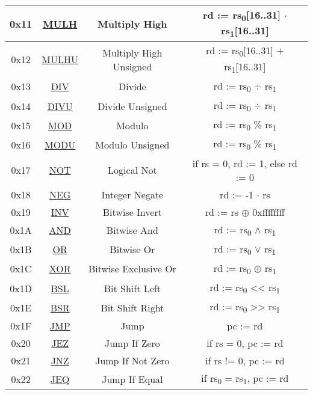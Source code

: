 \begin{center}
\begin{tabular}{|c|c|c|c|}
		\hline
		0x11 & \hyperref[sec:MULH]{MULH} & Multiply High & rd := rs\textsubscript{0}[16..31] $\cdot$ rs\textsubscript{1}[16..31]\\
		\hline
		0x12 & \hyperref[sec:MULHU]{MULHU} & Multiply High Unsigned & rd := rs\textsubscript{0}[16..31] $+$ rs\textsubscript{1}[16..31]\\
		\hline
		0x13 & \hyperref[sec:DIV]{DIV} & Divide & rd := rs\textsubscript{0} $\div$ rs\textsubscript{1}\\
		\hline
		0x14 & \hyperref[sec:DIVU]{DIVU} & Divide Unsigned & rd := rs\textsubscript{0} $\div$ rs\textsubscript{1}\\
		\hline
		0x15 & \hyperref[sec:MOD]{MOD} & Modulo & rd := rs\textsubscript{0} \% rs\textsubscript{1}\\
		\hline
		0x16 & \hyperref[sec:MODU]{MODU} & Modulo Unsigned & rd := rs\textsubscript{0} \% rs\textsubscript{1}\\
		\hline
		\hline
		0x17 & \hyperref[sec:NOT]{NOT} & Logical Not & if rs = 0, rd := 1, else rd := 0\\
		\hline
		0x18 & \hyperref[sec:NEG]{NEG} & Integer Negate & rd := -1 $\cdot$ rs\\
		\hline
		0x19 & \hyperref[sec:INV]{INV} & Bitwise Invert & rd := rs $\oplus$ 0xffffffff\\
		\hline
		\hline
		0x1A & \hyperref[sec:AND]{AND} & Bitwise And & rd := rs\textsubscript{0} $\land$ rs\textsubscript{1}\\
		\hline
		0x1B & \hyperref[sec:OR]{OR} & Bitwise Or & rd := rs\textsubscript{0} $\lor$ rs\textsubscript{1}\\
		\hline
		0x1C & \hyperref[sec:XOR]{XOR} & Bitwise Exclusive Or & rd := rs\textsubscript{0} $\oplus$ rs\textsubscript{1}\\
		\hline
		0x1D & \hyperref[sec:BSL]{BSL} & Bit Shift Left & rd := rs\textsubscript{0} << rs\textsubscript{1}\\
		\hline
		0x1E & \hyperref[sec:BSR]{BSR} & Bit Shift Right & rd := rs\textsubscript{0} >> rs\textsubscript{1}\\
		\hline
		\hline
		0x1F & \hyperref[sec:JMP]{JMP} & Jump & pc := rd\\
		\hline
		0x20 & \hyperref[sec:JEZ]{JEZ} & Jump If Zero & if rs = 0, pc := rd\\
		\hline
		0x21 & \hyperref[sec:JNZ]{JNZ} & Jump If Not Zero & if rs != 0, pc := rd\\
		\hline
		0x22 & \hyperref[sec:JEQ]{JEQ} & Jump If Equal & if rs\textsubscript{0} = rs\textsubscript{1}, pc := rd\\

\end{tabular}
\end{center}
